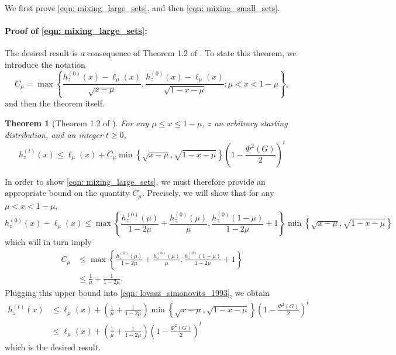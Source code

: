 \documentclass[11pt,twoside]{article}
\newtheorem{theorem}{Theorem}
\theoremstyle{definition}
\newcommand{\set}[1]{\left\{#1\right\}}
\newcommand{\1}{\mathbbm{1}}
\begin{document}
We first prove \eqref{eqn: mixing_large_sets}, and then \eqref{eqn: mixing_small_sets}.
\paragraph{Proof of \eqref{eqn: mixing_large_sets}:}
The desired result is a consequence of Theorem 1.2 of \cite{lovasz1990}. To state this theorem, we introduce the notation
\begin{equation*}
C_{\mu} = \max \set{\frac{h_z^{(0)}(x) - \ell_{\mu}(x)}{\sqrt{x - \mu}}, \frac{h_z^{(0)}(x) - \ell_{\mu}(x)}{\sqrt{1 - x - \mu}}: \mu < x < 1 - \mu},
\end{equation*}
and then the theorem itself.
\begin{theorem}[Theorem 1.2 of \cite{lovasz1990}]
	\label{thm: lovasz_simonovits_1993}
	For any $\mu \leq x \leq 1 - \mu$, $z$ an arbitrary starting distribution, and an integer $t \geq 0$,
	\begin{equation}
	\label{eqn: lovasz_simonovits_1993}
	h_z^{(t)}(x) \leq \ell_{\mu}(x) + C_{\mu} \min \set{\sqrt{x - \mu}, \sqrt{1 - x - \mu}} \left(1 - \frac{\Phi^2(G)}{2}\right)^t
	\end{equation}
\end{theorem}
In order to show \eqref{eqn: mixing_large_sets}, we must therefore provide an appropriate bound on the quantity $C_{\mu}$. Precisely, we will show that for any $\mu < x < 1 - \mu$,
\begin{equation}
\label{eqn: lt_ub_1}
h_z^{(0)}(x) - \ell_{\mu}(x) \leq \max \set{\frac{h_z^{(0)}(\mu)}{1 - 2\mu} + \frac{h_z^{(0)}(\mu)}{\mu} , \frac{h_z^{(0)}(1 - \mu) }{1 - 2\mu} + 1 } \min \set{\sqrt{x - \mu},\sqrt{1 - x - \mu}}
\end{equation}
which will in turn imply
\begin{align*}
C_{\mu} & \leq \max \set{\frac{h_z^{(0)}(\mu)}{1 - 2\mu} + \frac{h_z^{(0)}(\mu)}{\mu} , \frac{h_z^{(0)}(1 - \mu) }{1 - 2\mu} + 1 } \\
& \leq \frac{1}{\mu} + \frac{1}{1 - 2\mu}.
\end{align*}
Plugging this upper bound into \eqref{eqn: lovasz_simonovits_1993}, we obtain
\begin{align*}
h_z^{(t)}(x) & \leq \ell_{\mu}(x) +  \left(\frac{1}{\mu} + \frac{1}{1 - 2\mu}\right)\min \set{\sqrt{x - \mu}, \sqrt{1 - x - \mu}} \left(1 - \frac{\Phi^2(G)}{2}\right)^t \\
& \leq \ell_{\mu}(x) +  \left(\frac{1}{\mu} + \frac{1}{1 - 2\mu}\right)\left(1 - \frac{\Phi^2(G)}{2}\right)^t
\end{align*}
which is the desired result.
\end{document}
